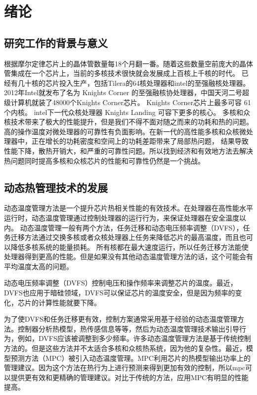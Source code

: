 
\chapter{绪论}
\section{研究工作的背景与意义}\label{sec:mean}
根据摩尔定律芯片上的晶体管数量每18个月翻一番。随着这些数量空前庞大的晶体管集成在一个芯片上，当前的多核技术很快就会发展成上百核上千核的时代\cite{borkar:DAC'07}。
已经有几十核的芯片投入生产，包括Tilera的64核处理器和intel的至强融核处理器。2012年Intel就发布了名为 Knights Corner 的至强融核协处理器，中国天河二号超级计算机就装了48000个Knights Corner芯片。
Knights Corner芯片上最多可容 61个内核。
intel下一代众核处理器 Knights Landing 可容下更多的核心。
多核和众核技术带来了极大的性能提升，但是我们不得不面对随之而来的功耗和热的问题。
高的操作温度对微处理器的可靠性有负面影响。在新一代的高性能多核和众核微处理器中，正在增长的功耗密度和空间上的功耗差距带来了局部热问题，
结果导致性能下降，散热开销大，和严重的可靠性问题。所以找到经济和有效地方法去解决热问题同时提高多核和众核芯片的性能和可靠性仍然是一个挑战。

\section{动态热管理技术的发展}\label{sec:his}

动态温度管理方法是一个提升芯片热相关性能的有效技术。在处理器在高性能水平运行时，动态温度管理通过控制处理器的运行行为，来保证处理器在安全温度以内。
动态温度管理一般有两个方法，任务迁移和动态电压频率调整（DVFS），任务迁移方法通过交换多核或者众核处理器上任务来降低芯片的最高温度，而且也可以降低多核系统的能量损耗。
所有核都在最大速度运行，所以任务迁移方法能使处理器得到更高的性能。但是如果没有其他动态温度管理方法的话，这个可能会有平均温度太高的问题。

 动态电压频率调整（DVFS）控制电压和操作频率来调整芯片的温度。最近，DVFS也应用于暗硅领域，DVFS可以保证芯片的温度安全，但是因为频率的变化，芯片的计算性能就要下降。
 
 为了使DVFS和任务迁移更有效，控制方案通常采用基于经验的动态温度管理方法。控制器分析热模型，热传感信息等等，然后为动态温度管理技术输出引导行为，例如，DVFS应该被调整到多少频率。许多动态温度管理方法是基于传统控制方法的。但是这些方法并不太适合多核和众核热系统，因为他的复杂性。最近，模型预测方法（MPC）被引入动态温度管理。MPC利用芯片的热模型输出功率上的管理建议。因为这个方法在热行为上进行预测来得到更加有效的控制，所以mpc可以提供更有效和更精确的管理建议。对比于传统的方法，应用MPC有明显的性能提高。
 
